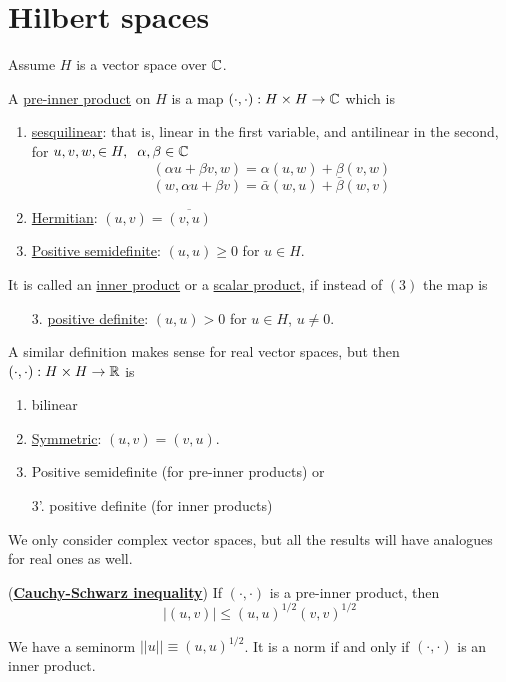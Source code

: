 

\section{Hilbert spaces}
Assume $H$ is a vector space over $\mathbb{C}$.
\begin{definition}
    A \underline{pre-inner product} on $H$ is a map $(\cdot,\cdot):H\times H\rightarrow\mathbb{C}$ which is 
    \begin{enumerate}
        \item \underline{sesquilinear}: that is, linear in the first variable, and antilinear in the second, for $u,v,w,\in H,\hspace{2mm} \alpha,\beta\in\mathbb{C}$
        $$(\alpha u+\beta v,w) = \alpha (u,w)+\beta (v,w)$$
        $$(w,\alpha u+\beta v) = \bar\alpha (w,u) + \bar\beta (w,v)$$
        
        \item \underline{Hermitian}: $(u,v)=\overline{(v,u)}$
        \item \underline{Positive semidefinite}: $(u,u)\geq 0$ for $u\in H$.
    \end{enumerate}
    It is called an \underline{inner product} or a \underline{scalar product}, if instead of $(3)$ the map is
    \begin{enumerate}
        \item[3.]  \underline{positive definite}: $(u,u)>0$ for $u\in H$, $u\neq 0$.
    \end{enumerate}
   A similar definition makes sense for real vector spaces, but then $(\cdot,\cdot):H\times H\rightarrow\mathbb{R}$ is 
   \begin{enumerate}
    \item bilinear
    \item \underline{Symmetric}: $(u,v)=(v,u)$.
    \item Positive semidefinite (for pre-inner products) or 
    \item[3'.] positive definite (for inner products) 
   \end{enumerate}
   We only consider complex vector spaces, but all the results will have analogues for real ones as well.
\end{definition}

\begin{theorem}(\underline{\textbf{Cauchy-Schwarz inequality}})
    If $(\cdot,\cdot)$ is a pre-inner product, then $$|(u,v)|\leq (u,u)^{1/2}(v,v)^{1/2}$$
    
\end{theorem}
\begin{corollary}
    We have a seminorm $||u||\equiv (u,u)^{1/2}$. It is a norm if and only if $(\cdot,\cdot)$ is an inner product. 
\end{corollary}

